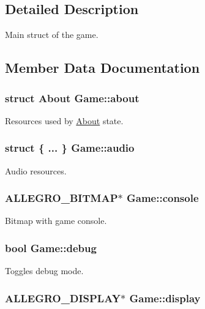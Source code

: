\subsection{Detailed Description}
Main struct of the game. 

\subsection{Member Data Documentation}
\hypertarget{structGame_a0f7f35de759c984c4b53c86fb0dcbd44}{
\subsubsection[{about}]{\setlength{\rightskip}{0pt plus 5cm}struct {\bf About} Game\-::about}}\label{structGame_a0f7f35de759c984c4b53c86fb0dcbd44}
Resources used by \hyperlink{structAbout}{About} state. \hypertarget{structGame_abfff07173afcb317b39988d9e1e0b9f7}{
\subsubsection[{audio}]{\setlength{\rightskip}{0pt plus 5cm}struct \{ ... \}   Game\-::audio}}\label{structGame_abfff07173afcb317b39988d9e1e0b9f7}
Audio resources. \hypertarget{structGame_aa2e3d0922374dc870a1aeabf9e3b8ae2}{
\subsubsection[{console}]{\setlength{\rightskip}{0pt plus 5cm}A\-L\-L\-E\-G\-R\-O\-\_\-\-B\-I\-T\-M\-A\-P$\ast$ Game\-::console}}\label{structGame_aa2e3d0922374dc870a1aeabf9e3b8ae2}
Bitmap with game console. \hypertarget{structGame_ad1a3eb5c2d99f8cb9c1f7eb91689af6d}{
\subsubsection[{debug}]{\setlength{\rightskip}{0pt plus 5cm}bool Game\-::debug}}\label{structGame_ad1a3eb5c2d99f8cb9c1f7eb91689af6d}
Toggles debug mode. \hypertarget{structGame_a2bf8ece79fe05b03c31f2e2ede42e5f5}{
\subsubsection[{display}]{\setlength{\rightskip}{0pt plus 5cm}A\-L\-L\-E\-G\-R\-O\-\_\-\-D\-I\-S\-P\-L\-A\-Y$\ast$ Game\-::display}}\label{structGame_a2bf8ece79fe05b03c31f2e2ede42e5f5}

